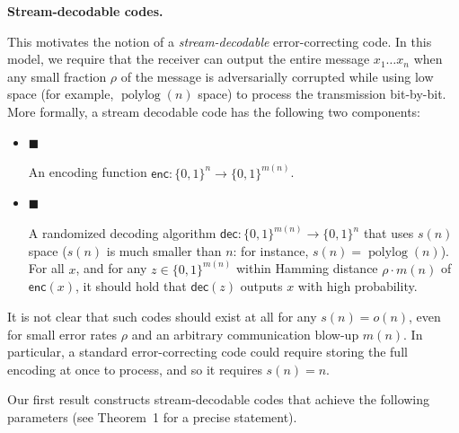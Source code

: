 \par\medskip\noindent\textbf{Stream-decodable codes.}\par




This motivates the notion of a \emph{stream-decodable} error-correcting code. In this model, we require that the receiver can output the entire message $x_{1}\ldots x_{n}$ when any small fraction $\rho$ of the message is adversarially corrupted while using low space (for example, $\operatorname{polylog}(n)$ space) to process the transmission bit-by-bit.
More formally, a stream decodable code has the following two components:\par


\begin{itemize}


\item[] 
$\blacksquare$ 


An encoding function $\mathsf{enc}:\{0,1\}^{n}\to\{0,1\}^{m(n)}$.\par





\item[] 
$\blacksquare$ 


A randomized decoding algorithm $\mathsf{dec}:\{0,1\}^{m(n)}\to\{0,1\}^{n}$ that uses $s(n)$ space ($s(n)$ is much smaller than $n$: for instance, $s(n)=\operatorname{polylog}(n)$). For all $x$, and for any $z\in\{0,1\}^{m(n)}$ within Hamming distance $\rho\cdot m(n)$ of $\mathsf{enc}(x)$, it should hold that $\mathsf{dec}(z)$ outputs $x$ with high probability.\par





\end{itemize}




It is not clear that such codes should exist at all for any $s(n)=o(n)$, even for small error rates $\rho$ and an arbitrary communication blow-up $m(n)$. In particular, a standard error-correcting code could require storing the full encoding at once to process, and so it requires $s(n)=n$.\par




Our first result constructs stream-decodable codes that achieve the following parameters (see Theorem 1 for a precise statement).\par


